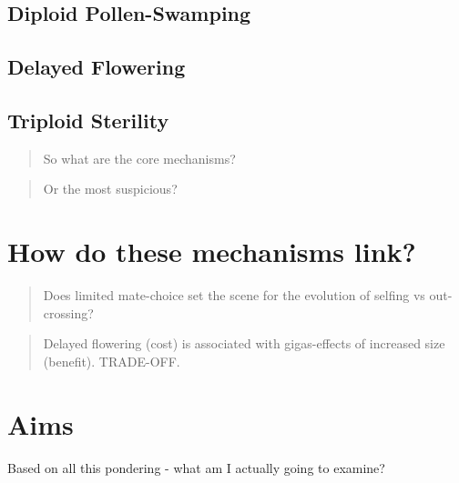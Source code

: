 \documentclass[openany, 12pt, draft]{book}
\begin{document}
\hypertarget{pollen-swamping}{%
\subsection{Diploid Pollen-Swamping}\label{pollen-swamping}}

\hypertarget{flowering}{%
\subsection{Delayed Flowering}\label{flowering}}

\hypertarget{sterility}{%
\subsection{Triploid Sterility}\label{sterility}}

\begin{quote}
So what are the core mechanisms?
\end{quote}

\begin{quote}
Or the most suspicious?
\end{quote}

\hypertarget{how-do-these-mechanisms-link}{%
\section{How do these mechanisms link?}\label{how-do-these-mechanisms-link}}

\begin{quote}
Does limited mate-choice set the scene for the evolution of selfing vs out-crossing?
\end{quote}

\begin{quote}
Delayed flowering (cost) is associated with gigas-effects of increased size (benefit). TRADE-OFF.
\end{quote}

\hypertarget{aims}{%
\section{Aims}\label{aims}}

Based on all this pondering - what am I actually going to examine?


\end{document}

